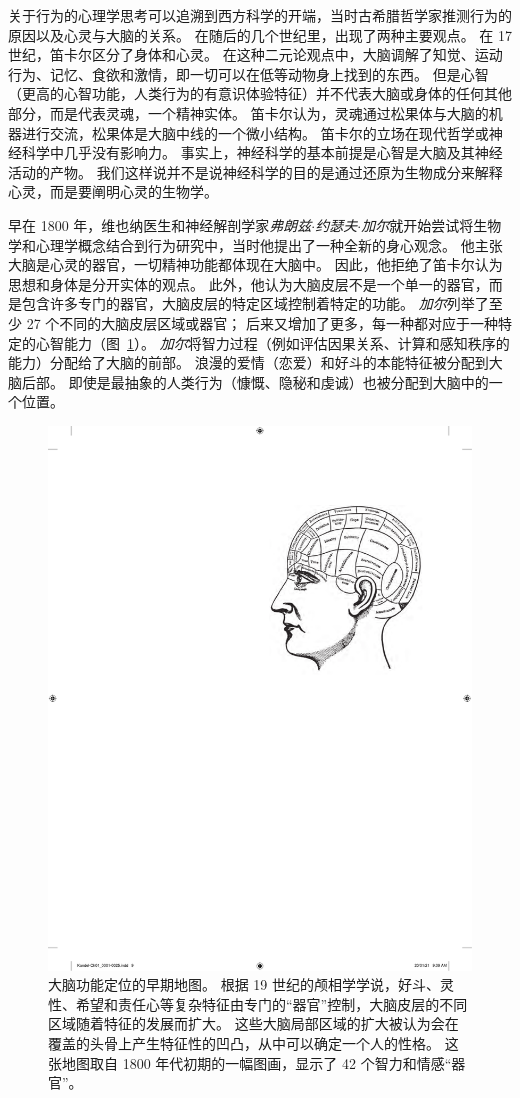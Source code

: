 关于行为的心理学思考可以追溯到西方科学的开端，当时古希腊哲学家推测行为的原因以及心灵与大脑的关系。
在随后的几个世纪里，出现了两种主要观点。
在 17 世纪，笛卡尔区分了身体和心灵。
在这种二元论观点中，大脑调解了知觉、运动行为、记忆、食欲和激情，即一切可以在低等动物身上找到的东西。
但是心智（更高的心智功能，人类行为的有意识体验特征）并不代表大脑或身体的任何其他部分，而是代表灵魂，一个精神实体。
笛卡尔认为，灵魂通过松果体与大脑的机器进行交流，松果体是大脑中线的一个微小结构。
笛卡尔的立场在现代哲学或神经科学中几乎没有影响力。
事实上，神经科学的基本前提是心智是大脑及其神经活动的产物。
我们这样说并不是说神经科学的目的是通过还原为生物成分来解释心灵，而是要阐明心灵的生物学。


早在 1800 年，维也纳医生和神经解剖学家\textit{弗朗兹$\cdot$约瑟夫$\cdot$加尔}就开始尝试将生物学和心理学概念结合到行为研究中，当时他提出了一种全新的身心观念。
他主张大脑是心灵的器官，一切精神功能都体现在大脑中。
因此，他拒绝了笛卡尔认为思想和身体是分开实体的观点。
此外，他认为大脑皮层不是一个单一的器官，而是包含许多专门的器官，大脑皮层的特定区域控制着特定的功能。 
\textit{加尔}列举了至少 27 个不同的大脑皮层区域或器官； 后来又增加了更多，每一种都对应于一种特定的心智能力（图~\ref{fig:1_1}）。
\textit{加尔}将智力过程（例如评估因果关系、计算和感知秩序的能力）分配给了大脑的前部。
浪漫的爱情（恋爱）和好斗的本能特征被分配到大脑后部。
即使是最抽象的人类行为（慷慨、隐秘和虔诚）也被分配到大脑中的一个位置。


\begin{figure}[htbp]
	\centering
	\includegraphics[width=0.55\linewidth]{chap01/fig_1_1}
	\caption{大脑功能定位的早期地图。
		根据 19 世纪的颅相学学说，好斗、灵性、希望和责任心等复杂特征由专门的“器官”控制，大脑皮层的不同区域随着特征的发展而扩大。
		这些大脑局部区域的扩大被认为会在覆盖的头骨上产生特征性的凹凸，从中可以确定一个人的性格。
		这张地图取自 1800 年代初期的一幅图画，显示了 42 个智力和情感“器官”。}
	\label{fig:1_1}
\end{figure}


